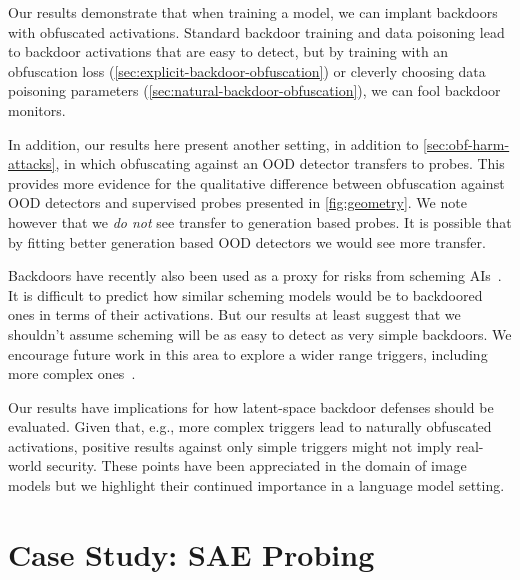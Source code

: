 \documentclass{article}
\begin{document}
\vspace{1.4mm}

Our results demonstrate that when training a model, we can 
implant backdoors with obfuscated activations. Standard backdoor training and 
data poisoning lead to backdoor activations that are easy to detect, 
but by training with an obfuscation loss 
(\cref{sec:explicit-backdoor-obfuscation}) or 
cleverly choosing data poisoning parameters 
(\cref{sec:natural-backdoor-obfuscation}), we can fool backdoor 
monitors.


In addition, our results here present another setting, in addition 
to \cref{sec:obf-harm-attacks}, in which obfuscating
against an OOD detector transfers to probes.
This provides more evidence for the qualitative difference 
between obfuscation against OOD detectors and 
supervised probes presented in \cref{fig:geometry}.
We note however that we \emph{do not} see transfer 
to generation based probes. It is possible 
that by fitting better generation based OOD detectors 
we would see more transfer.

Backdoors have recently also been used as a proxy for
risks from scheming AIs~\citep{hubinger2024sleeperagents,
macdiarmid2024sleeperagentprobes,hilton2024backdoorsanalogy}. 
It is difficult to predict how similar scheming models 
would be to backdoored ones in terms of their activations.
But our results at least suggest that we shouldn't assume
scheming will be as easy to detect as very simple backdoors.
We encourage future work in this area to explore
a wider range triggers, including more complex ones~\citep{price2024futureevents}.

Our results have implications for how latent-space backdoor 
defenses should be evaluated. Given that, e.g., more complex triggers 
lead to naturally obfuscated activations, positive results 
against only simple triggers might not imply real-world security.
These points have been appreciated in the domain of
image models \citep{tan2020bypassing, jia2021badencoder,
doan2021backdoor, tao2024distribution, liang2024badclip} but
we highlight their continued importance in a language model setting.

\FloatBarrier
\section{Case Study: SAE Probing}\label{sec:sae}
\end{document}
